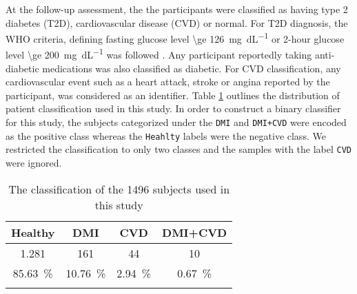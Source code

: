 \documentclass[journal,comsoc]{IEEEtran}
\begin{document}
At the follow-up assessment, the the participants were classified as having type 2 diabetes (T2D), cardiovascular disease (CVD) or normal. For T2D diagnosis, the WHO criteria, defining fasting glucose level \SI[round-mode = off,group-separator = {,}]{\ge 126}{\milli\gram\per\deci\liter} or 2-hour glucose level \SI[round-mode = off,group-separator = {,}]{\ge 200}{\milli\gram\per\deci\liter} was followed \cite{wei_effects_1998}. Any participant reportedly taking anti-diabetic medications was also classified as diabetic. For CVD classification, any cardiovascular event such as a heart attack, stroke or angina reported by the participant, was considered as an identifier. Table \ref{tab:patients} outlines the distribution of patient classification used in this study. In order to construct a binary classifier for this study, the subjects categorized under the \texttt{DMI} and \texttt{DMI+CVD} were encoded as the positive class whereas the \texttt{Heahlty}  labels were the negative class. We restricted the classification to only two classes and the samples with the label \texttt{CVD} were ignored.
%
\begin{table}[!h]
  \caption{The classification of the \num[group-minimum-digits=4, group-separator = {,}]{1496} subjects used in this study}
  \centering
  \begin{tabular}{c c c c}
    \toprule
    Healthy &  DMI & CVD & DMI+CVD\\
    \midrule \midrule
    \num[group-minimum-digits=4, group-separator = {,}]{1,281} & \num{161} & \num{44} & \num{10}\\
    \SI{85.63}{\percent} & \SI{10.76}{\percent} & \SI[round-precision=3]{2.94}{\percent} & \SI[round-precision=2]{0.67}{\percent} \\
    \bottomrule \\
  \end{tabular}
  \label{tab:patients}
\end{table}

\end{document}

